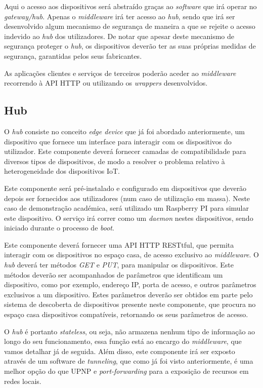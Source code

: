 Aqui o acesso aos dispositivos será abstraído graças ao \textit{software} que irá operar no \textit{gateway/hub}. Apenas o \textit{middleware} irá ter acesso ao \textit{hub}, sendo que irá ser desenvolvido algum mecanismo de segurança de maneira a que se rejeite o acesso indevido ao \textit{hub} dos utilizadores. De notar que apesar deste mecanismo de segurança proteger o \textit{hub}, os dispositivos deverão ter as suas próprias medidas de segurança, garantidas pelos seus fabricantes.

As aplicações clientes e serviços de terceiros poderão aceder ao \textit{middleware} recorrendo à API HTTP ou utilizando os \textit{wrappers} desenvolvidos.

\subsection{Hub}

O \textit{hub} consiste no conceito \textit{edge device} que já foi abordado anteriormente, um dispositivo que fornece um interface para interagir com os dispositivos do utilizador. Este componente deverá fornecer camadas de compatibilidade para diversos tipos de dispositivos, de modo a resolver o problema relativo à heterogeneidade dos dispositivos IoT.

Este componente será pré-instalado e configurado em dispositivos que deverão depois ser fornecidos aos utilizadores (num caso de utilização em massa). Neste caso de demonstração académica, será utilizado um Raspberry PI para simular este dispositivo. O serviço irá correr como um \textit{daemon} nestes dispositivos, sendo iniciado durante o processo de \textit{boot}.

Este componente deverá fornecer uma API HTTP RESTtful, que permita interagir com os dispositivos no espaço casa, de acesso exclusivo ao \textit{middleware}. O \textit{hub} deverá ter métodos \textit{GET} e \textit{PUT}, para manipular os dispositivos. Este métodos deverão ser acompanhados de parâmetros que identificam um dispositivo, como por exemplo, endereço IP, porta de acesso, e outros parâmetros exclusivos a um dispositivo. Estes parâmetros deverão ser obtidos em parte pelo sistema de descoberta de dispositivos presente neste componente, que procura no espaço casa dispositivos compatíveis, retornando os seus parâmetros de acesso.

O \textit{hub} é portanto \textit{stateless}, ou seja, não armazena nenhum tipo de informação ao longo do seu funcionamento, essa função está ao encargo do \textit{middleware}, que vamos detalhar já de seguida. Além disso, este componente irá ser exposto através de um software de \textit{tunneling}, que como já foi visto anteriormente, é uma melhor opção do que UPNP e \textit{port-forwarding} para a exposição de recursos em redes locais.

